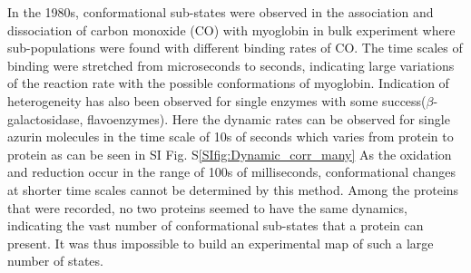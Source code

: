 \documentclass[journal=jacsat,manuscript=article]{achemso}
\begin{document}
In the 1980s, conformational sub-states were observed in the association and dissociation of carbon monoxide (CO) with myoglobin in bulk experiment where sub-populations were found with different binding rates of CO.
The time scales of binding were stretched from microseconds to seconds, indicating large variations of the reaction rate with the possible conformations of myoglobin.
Indication of heterogeneity has also been observed for single enzymes with some success($\beta$-galactosidase, flavoenzymes)\cite{lu1998single-molecule,kou2005single-molecule,english2006ever-fluctuating}.
Here the dynamic rates can be observed for single azurin molecules in the time scale of 10s of seconds which varies from protein to protein as can be seen in SI Fig. S\ref{SIfig:Dynamic_corr_many}
As the oxidation and reduction occur in the range of 100s of milliseconds, conformational changes at shorter time scales cannot be determined by this method.
Among the proteins that were recorded, no two proteins seemed to have the same dynamics, indicating the vast number of conformational sub-states that a protein can present.
It was thus impossible to build an experimental map of such a large number of states.


\end{document}
